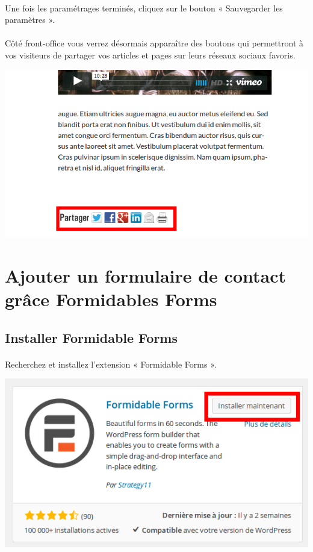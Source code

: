 \documentclass[10pt,a4paper]{article}
\begin{document}
\paragraph{}Une fois les paramétrages terminés, cliquez sur le bouton « Sauvegarder les paramètres ».
\paragraph{}Côté front-office vous verrez désormais apparaître des boutons qui permettront à vos visiteurs de partager vos articles et pages sur leurs réseaux sociaux favoris.
\begin{center}
\includegraphics[scale=0.3]{img/0178.png}
\end{center}
\newpage
\section{Ajouter un formulaire de contact grâce Formidables Forms}
\subsection{Installer Formidable Forms}
\paragraph{}Recherchez et installez l'extension « Formidable Forms ».
\begin{center}
\includegraphics[scale=0.3]{img/0179.png}
\end{center}
\end{document}
